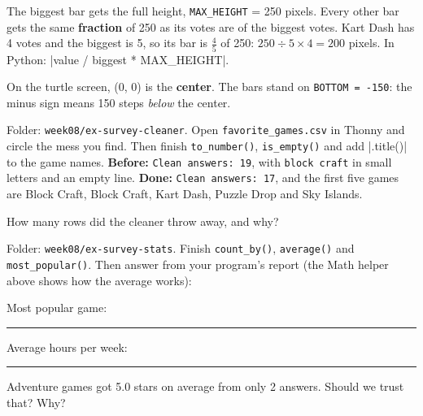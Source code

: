 \begin{tip}
The biggest bar gets the full height, \texttt{MAX\_HEIGHT} = 250 pixels. Every other bar gets the same \textbf{fraction} of 250 as its votes are of the biggest votes. Kart Dash has 4 votes and the biggest is 5, so its bar is $\frac{4}{5}$ of 250: $250 \div 5 \times 4 = 200$ pixels. In Python: \py|value / biggest * MAX_HEIGHT|.

On the turtle screen, (0, 0) is the \textbf{center}. The bars stand on \texttt{BOTTOM = -150}: the minus sign means 150 steps \emph{below} the center.
\end{tip}
\begin{center}
\end{center}

\begin{exercise}
Folder: \texttt{week08/ex-survey-cleaner}. Open \texttt{favorite\_games.csv} in Thonny and circle the mess you find. Then finish \texttt{to\_number()}, \texttt{is\_empty()} and add \py|.title()| to the game names. \textbf{Before:} \texttt{Clean answers: 19}, with \texttt{block craft} in small letters and an empty line. \textbf{Done:} \texttt{Clean answers: 17}, and the first five games are Block Craft, Block Craft, Kart Dash, Puzzle Drop and Sky Islands.

How many rows did the cleaner throw away, and why? 
\end{exercise}

\begin{exercise}
Folder: \texttt{week08/ex-survey-stats}. Finish \texttt{count\_by()}, \texttt{average()} and \texttt{most\_popular()}. Then answer from your program's report (the Math helper above shows how the average works):

Most popular game: \rule{4cm}{0.4pt} \quad Average hours per week: \rule{2cm}{0.4pt}

Adventure games got 5.0 stars on average from only 2 answers. Should we trust that? Why? 
\end{exercise}

